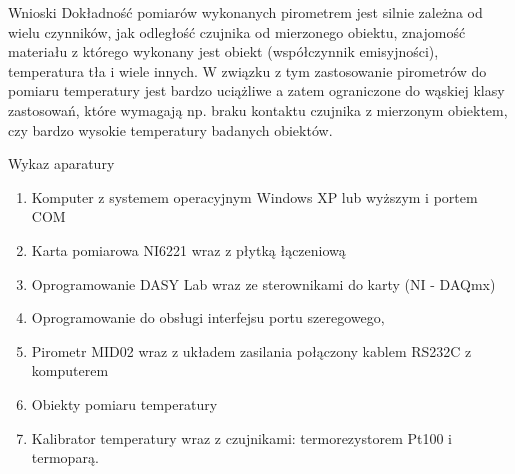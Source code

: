 \documentclass[12pt]{article}
\begin{document}
\newpage

\begin{section}{Wnioski}
	Dokładność pomiarów wykonanych pirometrem jest silnie zależna od wielu
	czynników, jak odległość czujnika od mierzonego obiektu, znajomość materiału z
	którego wykonany jest obiekt (współczynnik emisyjności), temperatura tła i
	wiele innych. W związku z tym zastosowanie pirometrów do pomiaru temperatury
	jest bardzo uciążliwe a zatem ograniczone do wąskiej klasy zastosowań, które
	wymagają np. braku kontaktu czujnika z mierzonym obiektem, czy bardzo wysokie
	temperatury badanych obiektów.
\end{section} 

\begin{section}{Wykaz aparatury}   
	\begin{enumerate}
	  \item Komputer z systemem operacyjnym Windows XP lub wyższym i portem COM
	  \item Karta pomiarowa NI6221 wraz z płytką łączeniową
	  \item Oprogramowanie DASY Lab wraz ze sterownikami do karty (NI - DAQmx)
	  \item Oprogramowanie do obsługi interfejsu portu szeregowego,
	  \item Pirometr MID02 wraz z układem zasilania połączony kablem RS232C z
	  komputerem
	  \item Obiekty pomiaru temperatury
	  \item Kalibrator temperatury wraz z czujnikami: termorezystorem Pt100 i
	  termoparą.
	\end{enumerate}
\end{section}
\end{document}
